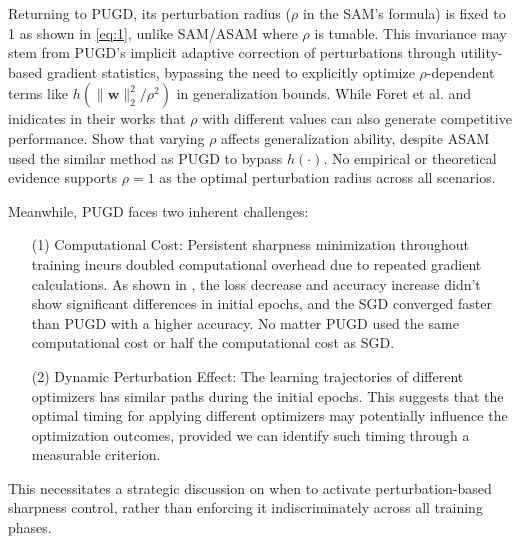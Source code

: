 \documentclass[10pt,twocolumn,letterpaper]{article}
\begin{document}
Returning to PUGD, its perturbation radius ($\rho$ in the SAM's formula) is fixed to 1 as shown in \eqref{eq:1}, unlike SAM/ASAM where $\rho$ is tunable. This invariance may stem from PUGD's implicit adaptive correction of perturbations through utility-based gradient statistics, bypassing the need to explicitly optimize $\rho$-dependent terms like $h(\|\boldsymbol{w}\|_2^2/\rho^2)$ in generalization bounds. While Foret et al.\cite{foret2021sharpnessawareminimizationefficientlyimproving} and \cite{kwon2021asamadaptivesharpnessawareminimization} inidicates in their works that $\rho$ with different values can also generate competitive performance. Show that varying $\rho$ affects generalization ability, despite ASAM used the similar method as PUGD to bypass $h(\cdot)$. No empirical or theoretical evidence supports $\rho = 1$ as the optimal perturbation radius across all scenarios.

Meanwhile, PUGD faces two inherent challenges:
\begin{enumerate}
    \item[(1)] Computational Cost: Persistent sharpness minimization throughout training incurs doubled computational overhead due to repeated gradient calculations. As shown in , the loss decrease and accuracy increase didn't show significant differences in initial epochs, and the SGD converged faster than PUGD with a higher accuracy. No matter PUGD used the same computational cost or half the computational cost as SGD.
	\item[(2)] Dynamic Perturbation Effect: The learning trajectories of different optimizers has similar paths during the initial epochs\cite{Tseng_2022}. This suggests that the optimal timing for applying different optimizers may potentially influence the optimization outcomes, provided we can identify such timing through a measurable criterion.
\end{enumerate}
This necessitates a strategic discussion on when to activate perturbation-based sharpness control, rather than enforcing it indiscriminately across all training phases.
\end{document}
